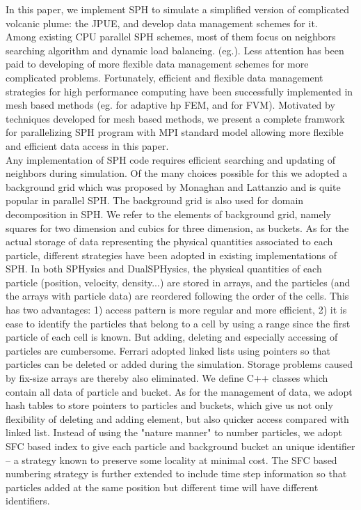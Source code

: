 \documentclass[conference,compsoc]{IEEEtran}
\begin{document}
In this paper, we implement SPH to simulate a simplified version of complicated volcanic plume: the JPUE, and develop data management schemes for it.\\
Among existing CPU parallel SPH schemes, most of them focus on neighbors searching algorithm and dynamic load balancing. (eg.\cite{ferrari2009new, crespo2015dualsphysics}). Less attention has been paid to developing of more flexible data management schemes for more complicated problems. 
Fortunately, efficient and flexible data management strategies for high performance computing have been successfully implemented in mesh based methods (eg. \cite{laszloffy2000simple} for adaptive hp FEM, and \cite{pitman2003computing, patra2005parallel} for FVM). Motivated by techniques developed for mesh based methods, we present a complete framwork for parallelizing SPH program with MPI standard model allowing more flexible and efficient data access in this paper.\\
Any implementation of SPH code requires efficient searching and updating of neighbors during simulation. Of the many choices possible for this we adopted a background grid which was proposed by Monaghan and Lattanzio\cite{monaghan1985refined} and is quite popular in parallel SPH. The background grid is also used for domain decomposition in SPH. We refer to the elements of background grid, namely squares for two dimension and cubics for three dimension, as buckets. 
%
%
As for the actual storage of data representing the physical quantities associated to each particle, different strategies have been adopted in existing implementations of SPH. 
In both SPHysics and DualSPHysics\cite{crespo2015dualsphysics}, the physical quantities of each particle (position, velocity, density...) are stored in arrays, and the particles (and the arrays with particle data) are reordered following the order of the cells. This has two advantages: 1) access pattern is more regular and more efficient, 2) it is ease to identify the particles that belong to a cell by using a range since the first particle of each cell is known. But adding, deleting and especially accessing of particles are cumbersome. Ferrari\cite{ferrari2009new} adopted linked lists using pointers so that particles can be deleted or added during the simulation. Storage problems caused by fix-size arrays are thereby also eliminated. We define C++ classes which contain all data of particle and bucket. As for the management of data, we adopt hash tables to store pointers to particles and buckets, which give us not only flexibility of deleting and adding element, but also quicker access compared with linked list. Instead of using the "nature manner" to number particles, we adopt SFC based index to give each particle and background bucket an unique identifier -- a strategy known to preserve some locality at minimal cost. The SFC based numbering strategy is further extended to include time step information so that particles added at the same position but different time will have different identifiers. 
\end{document}
